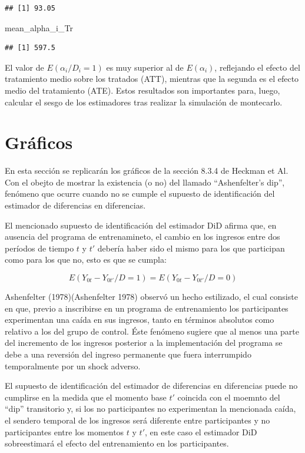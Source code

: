 \documentclass[]{article}
\newenvironment{Shaded}{\begin{snugshade}}{\end{snugshade}}
\newcommand{\NormalTok}[1]{{#1}}
\begin{document}
\begin{verbatim}
## [1] 93.05
\end{verbatim}

\begin{Shaded}
\begin{Highlighting}[]
\NormalTok{mean_alpha_i_Tr}
\end{Highlighting}
\end{Shaded}

\begin{verbatim}
## [1] 597.5
\end{verbatim}

El valor de $E(\alpha_{i}/D_{i}=1)$ es muy superior al de
$E(\alpha_{i})$, reflejando el efecto del tratamiento medio sobre los
tratados (ATT), mientras que la segunda es el efecto medio del
tratamiento (ATE). Estos resultados son importantes para, luego,
calcular el sesgo de los estimadores tras realizar la simulación de
montecarlo.

\section{Gráficos}\label{graficos}

En esta sección se replicarán los gráficos de la sección 8.3.4 de
Heckman et Al. Con el obejto de mostrar la existencia (o no) del llamado
``Ashenfelter's dip'', fenómeno que ocurre cuando no se cumple el
supuesto de identificación del estimador de diferencias en diferencias.

El mencionado supuesto de identificación del estimador DiD afirma que,
en ausencia del programa de entrenamineto, el cambio en los ingresos
entre dos períodos de tiempo $t$ y $t'$ debería haber sido el mismo para
los que participan como para los que no, esto es que se cumpla:

\[ E(Y_{0t}-Y_{0t'}/D=1)=E(Y_{0t}-Y_{0t'}/D=0) \]

Ashenfelter (1978)(Ashenfelter 1978) observó un hecho estilizado, el
cual consiste en que, previo a inscribirse en un programa de
entrenamiento los participantes experimentan una caída en sus ingresos,
tanto en términos absolutos como relativo a los del grupo de control.
Éste fenómeno sugiere que al menos una parte del incremento de los
ingresos posterior a la implementación del programa se debe a una
reversión del ingreso permanente que fuera interrumpido temporalmente
por un shock adverso.

El supuesto de identificación del estimador de diferencias en
diferencias puede no cumplirse en la medida que el momento base $t'$
coincida con el moemnto del ``dip'' transitorio y, si los no
participantes no experimentan la mencionada caída, el sendero temporal
de los ingresos será diferente entre participantes y no participantes
entre los momentos $t$ y $t'$, en este caso el estimador DiD
sobreestimará el efecto del entrenamiento en los participantes.
\end{document}
